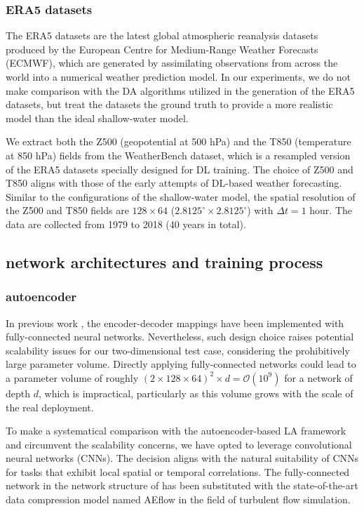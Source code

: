 \documentclass{article}
\newcommand{\mO}{\mathcal{O}}
\begin{document}
\subsubsection{ERA5 datasets}
The ERA5 datasets \cite{ERA5} are the latest global atmospheric reanalysis datasets produced by the European Centre for Medium-Range Weather Forecasts (ECMWF), which are generated by assimilating observations from across the world into a numerical weather prediction model. In our experiments, we do not make comparison with the DA algorithms utilized in the generation of the ERA5 datasets, but treat the datasets the ground truth to provide a more realistic model than the ideal shallow-water model.

We extract both the Z500 (geopotential at 500 hPa) and the T850 (temperature at 850 hPa) fields from the WeatherBench \cite{Rasp2020WeatherBench} dataset, which is a resampled version of the ERA5 datasets specially designed for DL training. The choice of Z500 and T850 aligns with those of the early attempts \cite{Clare2021,Scher2021Ensemble,Weyn2020,Rasp2021} of DL-based weather forecasting. Similar to the configurations of the shallow-water model, the spatial resolution of the Z500 and T850 fields are $128\times64$ ($2.8125^\circ\times2.8125^\circ$) with $\Delta t=1$ hour. The data are collected from 1979 to 2018 (40 years in total).
\subsection{network architectures and training process}
\subsubsection{autoencoder}
In previous work \cite{Peyron2021LAwithAE}, the encoder-decoder mappings have been implemented with fully-connected neural networks. Nevertheless, such design choice raises potential scalability issues for our two-dimensional test case, considering the prohibitively large parameter volume. Directly applying fully-connected networks could lead to a parameter volume of roughly $(2\times128\times64)^2\times d=\mO(10^9)$ for a network of depth $d$, which is impractical, particularly as this volume grows with the scale of the real deployment.

To make a systematical comparison with the autoencoder-based LA framework and circumvent the scalability concerns, we have opted to leverage convolutional neural networks (CNNs). The decision aligns with the natural suitability of CNNs for tasks that exhibit local spatial or temporal correlations. The fully-connected network in the network structure of \cite{Peyron2021LAwithAE} has been substituted with the state-of-the-art data compression model named AEflow \cite{AEflow} in the field of turbulent flow simulation.
\end{document}
